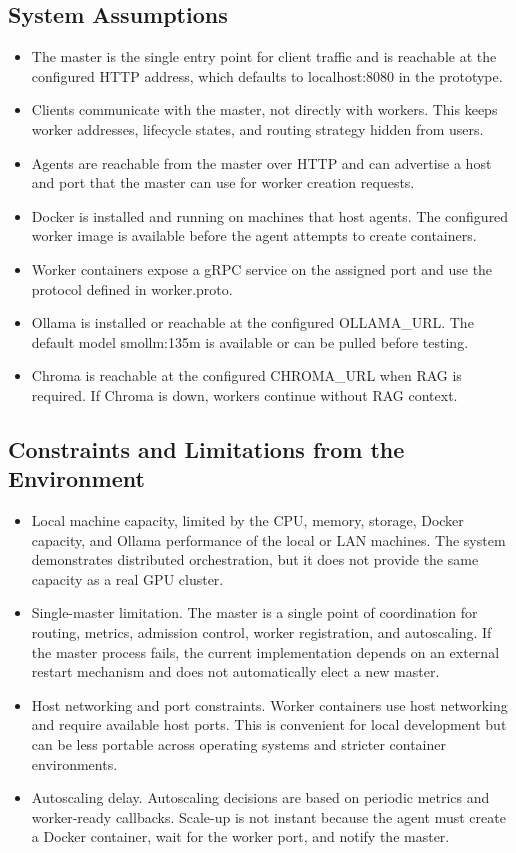 \subsection{System Assumptions}
\begin{itemize}[leftmargin=1.5em]
  \item The master is the single entry point for client traffic and is reachable at the configured HTTP address, which defaults to localhost:8080 in the prototype.
  \item Clients communicate with the master, not directly with workers. This keeps worker addresses, lifecycle states, and routing strategy hidden from users.
  \item Agents are reachable from the master over HTTP and can advertise a host and port that the master can use for worker creation requests.
  \item Docker is installed and running on machines that host agents. The configured worker image is available before the agent attempts to create containers.
  \item Worker containers expose a gRPC service on the assigned port and use the protocol defined in worker.proto.
  \item Ollama is installed or reachable at the configured OLLAMA_URL. The default model smollm:135m is available or can be pulled before testing.
  \item Chroma is reachable at the configured CHROMA_URL when RAG is required. If Chroma is down, workers continue without RAG context.
\end{itemize}

\subsection{Constraints and Limitations from the Environment}
\begin{itemize}[leftmargin=1.5em]
  \item Local machine capacity, limited by the CPU, memory, storage, Docker capacity, and Ollama performance of the local or LAN machines. The system demonstrates distributed orchestration, but it does not provide the same capacity as a real GPU cluster.
  \item Single-master limitation. The master is a single point of coordination for routing, metrics, admission control, worker registration, and autoscaling. If the master process fails, the current implementation depends on an external restart mechanism and does not automatically elect a new master.
  \item Host networking and port constraints. Worker containers use host networking and require available host ports. This is convenient for local development but can be less portable across operating systems and stricter container environments.
  \item Autoscaling delay. Autoscaling decisions are based on periodic metrics and worker-ready callbacks. Scale-up is not instant because the agent must create a Docker container, wait for the worker port, and notify the master.
\end{itemize}
